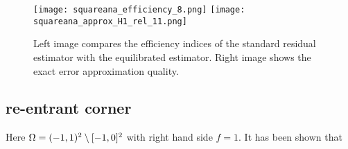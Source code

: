 \documentclass[thesis.tex]{subfiles}
\begin{document}
\begin{figure}
  \centering
  \texttt{[image: squareana\_efficiency\_8.png]}
  \texttt{[image: squareana\_approx\_H1\_rel\_11.png]}
  \caption{Left image compares the efficiency indices of the standard residual estimator with the equilibrated estimator. Right image
  shows the exact error approximation quality.}
  \label{fig:squareana}
\end{figure}

\subsection{re-entrant corner}
Here $\Omega = (-1,1)^2\setminus[-1,0]^2$ with right hand side $f = 1$. It has been shown that 
\end{document}
